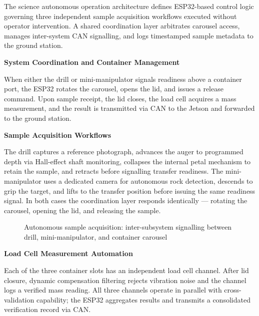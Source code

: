 
The science autonomous operation architecture defines ESP32-based control logic governing three independent sample acquisition workflows executed without operator intervention. A shared coordination layer arbitrates carousel access, manages inter-system CAN signalling, and logs timestamped sample metadata to the ground station.

\textbf{System Coordination and Container Management}

When either the drill or mini-manipulator signals readiness above a container port, the ESP32 rotates the carousel, opens the lid, and issues a release command. Upon sample receipt, the lid closes, the load cell acquires a mass measurement, and the result is transmitted via CAN to the Jetson and forwarded to the ground station.

\textbf{Sample Acquisition Workflows}

The drill captures a reference photograph, advances the auger to programmed depth via Hall-effect shaft monitoring, collapses the internal petal mechanism to retain the sample, and retracts before signalling transfer readiness. The mini-manipulator uses a dedicated camera for autonomous rock detection, descends to grip the target, and lifts to the transfer position before issuing the same readiness signal. In both cases the coordination layer responds identically — rotating the carousel, opening the lid, and releasing the sample.

\begin{figure}[H]
    \centering
    \caption{Autonomous sample acquisition: inter-subsystem signalling between drill, mini-manipulator, and container carousel}
    \label{fig:autonomous_workflow}
\end{figure}

\textbf{Load Cell Measurement Automation}

Each of the three container slots has an independent load cell channel. After lid closure, dynamic compensation filtering rejects vibration noise and the channel logs a verified mass reading. All three channels operate in parallel with cross-validation capability; the ESP32 aggregates results and transmits a consolidated verification record via CAN.